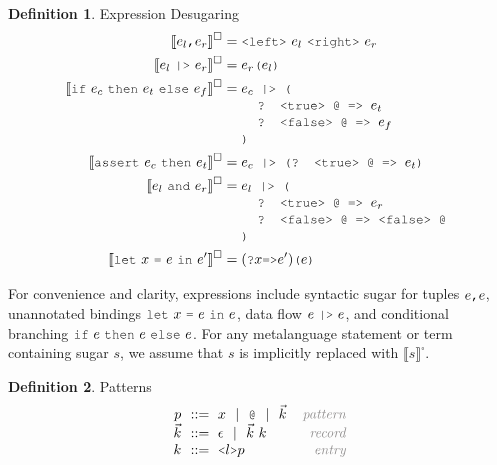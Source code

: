 \documentclass[acmsmall]{acmart}
\theoremstyle{definition}
\newtheorem{definition}{Definition}[section]
\begin{document}
\begin{definition} 
  \label{def:expression_desugaring}
  Expression Desugaring
  \hfill 
  \\
  \begin{align*}
      \llbracket e_l \J{,} e_r \rrbracket^\square &= \J{<left>}\ e_l \ \J{<right>}\ e_r
      \\
      \llbracket e_l\ \J{|>}\ e_r \rrbracket^\square &= e_r\J{(}e_l\J{)}
      \\
      \llbracket \J{if}\ e_c\ \J{then}\ e_t\ \J{else}\ e_f \rrbracket^\square &= 
      \begin{array}[t]{@{} l}
        e_c \J{ |> (}
          \\
          \I \J{? <true> @ => } e_t
          \\
          \I \J{? <false> @ => } e_f
          \\
        \J{)}
      \end{array}
      \\
      \llbracket \J{assert}\ e_c\ \J{then}\ e_t \rrbracket^\square &= 
      \begin{array}[t]{@{} l}
        e_c \J{ |> (? <true> @ => } e_t \J{)}
      \end{array}
      \\
      \llbracket e_l\ \J{and}\ e_r \rrbracket^\square &= 
      \begin{array}[t]{@{} l}
        e_l \J{ |> (}
          \\
          \I \J{? <true> @ => } e_r
          \\
          \I \J{? <false> @ => <false> @}
          \\
        \J{)}
      \end{array}
      \\
      \llbracket \J{let}\ x\ \J{=}\ e\ \J{in}\ e' \rrbracket^\square &= (\J{?}x \J{=>} e')\J{(}e\J{)}
  \end{align*}

\end{definition} 

\noindent
For convenience and clarity, expressions include syntactic sugar for tuples $e\J{,}e$, 
unannotated bindings $\J{let}\ x\ \J{=}\ e\ \J{in}\ e$, data flow $e\ \J{|>}\ e$,
and conditional branching $\J{if}\ e\ \J{then}\ e\ \J{else}\ e$.
For any metalanguage statement or term containing sugar $s$, we assume that $s$ is implicitly replaced with $\llbracket s \rrbracket^\square$.

\begin{definition} Patterns 
  \label{def:patterns}
  \[\begin{array}[t]{r@{}l@{}r}
    \nonterm{p} & \is 
      x \sep
      \J{@} \sep
      \vec{k}
    & \com{pattern}
    \\
    \nonterm{\vec{k}} & \is \epsilon \sep \vec{k}\ k
    & \com{record}
    \\
    \nonterm{k} & \is \J{<}l\J{>}p
    & \com{entry}
  \end{array}\]
\end{definition}
\end{document}

